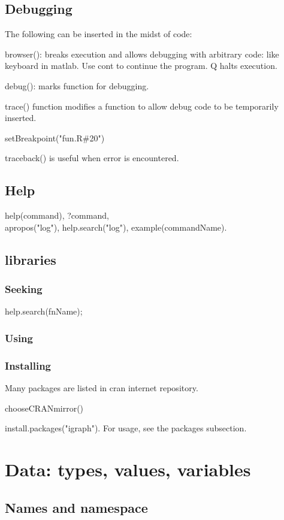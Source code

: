 \documentclass[oneside, article]{memoir}
\begin{document}
\subsection{Debugging}
The following can be inserted in the midst of code: 

browser(): breaks execution and allows debugging with arbitrary code: like keyboard in matlab. Use cont to continue the program. Q halts execution.

debug(): marks function for debugging.

trace() function modifies a function to allow debug code to be temporarily inserted.

setBreakpoint("fun.R\#20")

traceback() is useful when error is encountered.

\subsection{Help}
help(command), ?command, \\
apropos("log"), help.search("log"), example(commandName).

\subsection{libraries}
\subsubsection{Seeking}
help.search(fnName);

\subsubsection{Using}

\subsubsection{Installing}
Many packages are listed in cran internet repository.

chooseCRANmirror()

install.packages("igraph"). For usage, see the packages subsection.

\section{Data: types, values, variables}
\subsection{Names and namespace}
\end{document}
